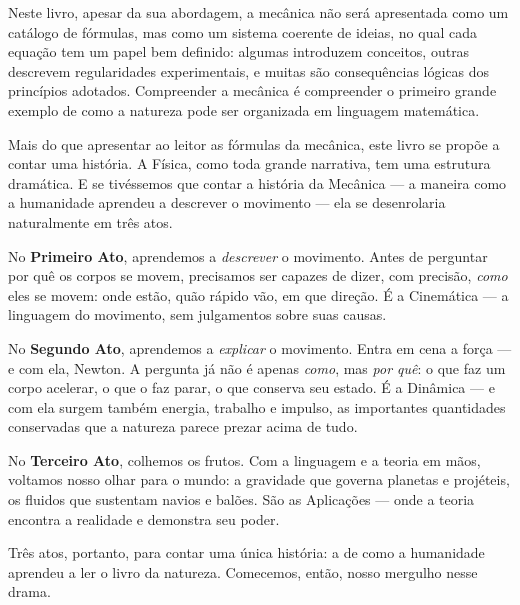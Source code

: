 Neste livro, apesar da sua abordagem, a mecânica não será apresentada como um catálogo de fórmulas, mas como um sistema coerente de ideias, no qual cada equação tem um papel bem definido: algumas introduzem conceitos, outras descrevem regularidades experimentais, e muitas são consequências lógicas dos princípios adotados. Compreender a mecânica é compreender o primeiro grande exemplo de como a natureza pode ser organizada em linguagem matemática.

Mais do que apresentar ao leitor as fórmulas da mecânica, este livro se propõe a contar uma história. A Física, como toda grande narrativa, tem uma estrutura dramática. E se tivéssemos que contar a história da Mecânica --- a maneira como a humanidade aprendeu a descrever o movimento --- ela se desenrolaria naturalmente em três atos.

No \textbf{Primeiro Ato}, aprendemos a \textit{descrever} o movimento. Antes de perguntar por quê os corpos se movem, precisamos ser capazes de dizer, com precisão, \textit{como} eles se movem: onde estão, quão rápido vão, em que direção. É a Cinemática --- a linguagem do movimento, sem julgamentos sobre suas causas.

No \textbf{Segundo Ato}, aprendemos a \textit{explicar} o movimento. Entra em cena a força --- e com ela, Newton. A pergunta já não é apenas \textit{como}, mas \textit{por quê}: o que faz um corpo acelerar, o que o faz parar, o que conserva seu estado. É a Dinâmica --- e com ela surgem também energia, trabalho e impulso, as importantes quantidades conservadas que a natureza parece prezar acima de tudo.

No \textbf{Terceiro Ato}, colhemos os frutos. Com a linguagem e a teoria em mãos, voltamos nosso olhar para o mundo: a gravidade que governa planetas e projéteis, os fluidos que sustentam navios e balões. São as Aplicações --- onde a teoria encontra a realidade e demonstra seu poder.

Três atos, portanto, para contar uma única história: a de como a humanidade aprendeu a ler o livro da natureza. Comecemos, então, nosso mergulho nesse drama.

